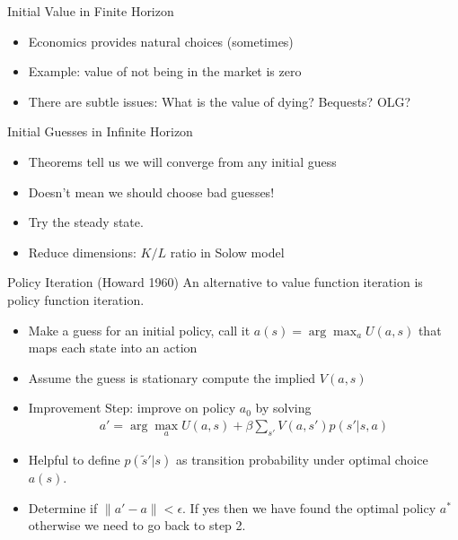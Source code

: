 \documentclass[xcolor=pdftex,dvipsnames,table,mathserif]{beamer}
\begin{document}
\begin{frame}{Initial Value in Finite Horizon}
\begin{itemize}
\item Economics provides natural choices (sometimes)
\item Example: value of not being in the market is zero
\item There are subtle issues: What is the value of dying? Bequests? OLG?
\end{itemize}
\end{frame}

\begin{frame}{Initial Guesses in Infinite Horizon}
\begin{itemize}
\item Theorems tell us we will converge from any initial guess
\item Doesn't mean we should choose bad guesses!
\item Try the steady state.
\item Reduce dimensions:  $K/L$ ratio in Solow model
\end{itemize}
\end{frame}

\begin{frame}{Policy Iteration (Howard 1960)}
An alternative to value function iteration is policy function iteration. 
\begin{itemize}
\item Make a guess for an initial policy, call it $a(s) = \arg \max_a U(a,s)$ that maps each state into an action
\item Assume the guess is stationary compute the implied $V(a,s)$
\item Improvement Step: improve on policy $a_0$ by solving 
\begin{eqnarray*}
a' = \arg \max_a U(a,s) + \beta \sum_{s'} V(a,s') p(s' | s,a)
\end{eqnarray*}
\item Helpful to define $p(\tilde{s}' | s)$ as transition probability under optimal choice $a(s)$.
\item Determine if $\| a' -a\| < \epsilon$. If yes then we have found the optimal policy $a^* $ otherwise we need to go back to step 2.
\end{itemize}
\end{frame}
\end{document}
